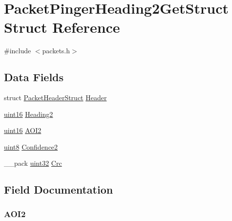 \hypertarget{struct_packet_pinger_heading2_get_struct}{}\section{Packet\+Pinger\+Heading2\+Get\+Struct Struct Reference}
\label{struct_packet_pinger_heading2_get_struct}


{\ttfamily \#include $<$packets.\+h$>$}

\subsection*{Data Fields}
\begin{DoxyCompactItemize}
\item 
struct \hyperlink{struct_packet_header_struct}{Packet\+Header\+Struct} \hyperlink{struct_packet_pinger_heading2_get_struct_ab201af50281aff5ed4f984f994938007}{Header}
\item 
\hyperlink{_h_y_d_r_a_s_8_x_2types_8h_ac2a9e79eb120216f855626495b7bd18a}{uint16} \hyperlink{struct_packet_pinger_heading2_get_struct_abd671b9322a5d710ed3b78a5401fe9c8}{Heading2}
\item 
\hyperlink{_h_y_d_r_a_s_8_x_2types_8h_ac2a9e79eb120216f855626495b7bd18a}{uint16} \hyperlink{struct_packet_pinger_heading2_get_struct_a58ceec925c0cbc53ee3c06f8269e1a37}{A\+O\+I2}
\item 
\hyperlink{_h_y_d_r_a_s_8_x_2types_8h_a33a5e996e7a90acefb8b1c0bea47e365}{uint8} \hyperlink{struct_packet_pinger_heading2_get_struct_a59acd93ce28964a3af4c5e4eb479de21}{Confidence2}
\item 
\+\_\+\+\_\+pack \hyperlink{_h_y_d_r_a_s_8_x_2types_8h_acbd4acd0d29e2d6c43104827f77d9cd2}{uint32} \hyperlink{struct_packet_pinger_heading2_get_struct_a9ac0191cb1217dfb4164ca0e333de3ac}{Crc}
\end{DoxyCompactItemize}


\subsection{Field Documentation}
\hypertarget{struct_packet_pinger_heading2_get_struct_a58ceec925c0cbc53ee3c06f8269e1a37}{}
\subsubsection[{A\+O\+I2}]{ A\+O\+I2}\label{struct_packet_pinger_heading2_get_struct_a58ceec925c0cbc53ee3c06f8269e1a37}
\hypertarget{struct_packet_pinger_heading2_get_struct_a59acd93ce28964a3af4c5e4eb479de21}{}
